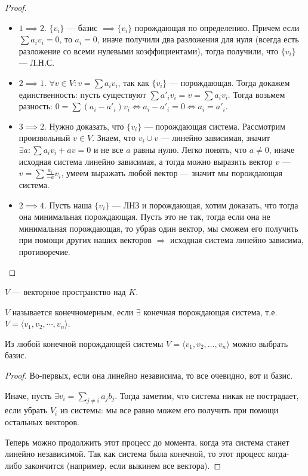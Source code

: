 \begin{proof}
    \slashn
     \begin{itemize}
	     \item $1 \implies 2$.  $\{v_i\}$ --- базис  $\implies \{v_i\}$ порождающая по определению. Причем если $\sum a_i v_i = 0$, то $a_i = 0$, иначе получили два разложения для нуля (всегда есть разложение со всеми нулевыми коэффициентами), тогда получили, что $\{v_i\}$ --- Л.Н.С.
         \item $2 \implies 1$.  $\forall v \in V\!: v = \sum a_i v_i$, так как $\{v_i\}$ --- порождающая. Тогда докажем единственность: пусть существуют $\sum a'_i v_i = v = \sum a_i v_i$. Тогда возьмем разность: $0 = \sum (a_i - a'_i) v_i \iff a_i - a'_i = 0 \iff a_i = a'_i$.
	 \item  $3 \implies 2$. Нужно доказать, что $\{v_i\}$ --- порождающая система. Рассмотрим произвольный $v \in V$. Знаем, что ${v_i} \cup {v}$ --- линейно зависимая, значит $\exists a: \sum a_i v_i + av = 0$ и не все $a$ равны нулю. Легко понять, что $a\neq 0$, иначе исходная система линейно зависимая, а тогда можно выразить вектор $v$ --- $v = \sum\frac{a_i}{-a}v_i$, умеем выражать любой вектор --- значит мы порождающая система.
         \item $2 \implies 4$. Пусть наша  $\{v_i\}$ --- ЛНЗ и порождающая, хотим доказать, что тогда она минимальная порождающая. Пусть это не так, тогда если она не минимальная порождающая, то убрав один вектор, мы сможем его получить при помощи других наших векторов  $\Rightarrow$ исходная система линейно зависима, противоречие.
    \end{itemize}
\end{proof}

\begin{definition}
    $V$ --- векторное пространство над  $K$.

    $V$ называется конечномерным, если  $\exists$ конечная порождающая система, т.е. $V = \langle v_1, v_2, \cdots, v_n \rangle$.
\end{definition}
\begin{lemma}
    Из любой конечной порождающей системы $V = \langle v_1, v_2, \ldots, v_n \rangle$ можно выбрать базис.
\end{lemma}
\begin{proof}
    Во-первых, если она линейно независима, то все очевидно, вот и базис.

    Иначе, пусть $\exists v_i = \sum\limits_{j \neq i}a_j b_j$. Тогда заметим, что система никак не пострадает, если убрать $V_i$ из системы: мы все равно можем его получить при помощи остальных векторов. 

    Теперь можно продолжить этот процесс до момента, когда эта система станет линейно независимой. Так как система была конечной, то этот процесс когда-либо закончится (например, если выкинем все вектора).
\end{proof}

